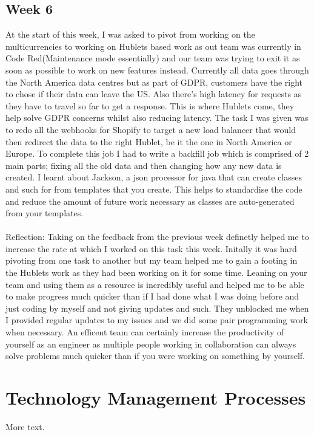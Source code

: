 \documentclass[11pt]{article} %
\begin{document}
\subsection{Week 6}
At the start of this week, I was asked to pivot from working on the multicurrencies to working on Hublets based work as out team was currently in Code Red(Maintenance mode essentially) and our team was trying to exit it as soon as possible to work on new features instead. Currently all data goes through the North America data centres but as part of GDPR, customers have the right to chose if their data can leave the US. Also there's high latency for requests as they have to travel so far to get a response. This is where Hublets come, they help solve GDPR concerns whilst also reducing latency. The task I was given was to redo all the webhooks for Shopify to target a new load balancer that would then redirect the data to the right Hublet, be it the one in North America or Europe. To complete this job I had to write a backfill job which is comprised of 2 main parts; fixing all the old data and then changing how any new data is created. I learnt about Jackson, a json processor for java that can create classes and such for from templates that you create. This helps to standardise the code and reduce the amount of future work necessary as classes are auto-generated from your templates. 
\\\\
Reflection: Taking on the feedback from the previous week definetly helped me to increase the rate at which I worked on this task this week. Initally it was hard pivoting from one task to another but my team helped me to gain a footing in the Hublets work as they had been working on it for some time. Leaning on your team and using them as a resource is incredibly useful and helped me to be able to make progress much quicker than if I had done what I was doing before and just coding by myself and not giving updates and such. They unblocked me when I provided regular updates to my issues and we did some pair programming work when necessary. An efficent team can certainly increase the productivity of yourself as an engineer as multiple people working in collaboration can always solve problems much quicker than if you were working on something by yourself.
\section{Technology Management Processes}

More text.
\end{document}
